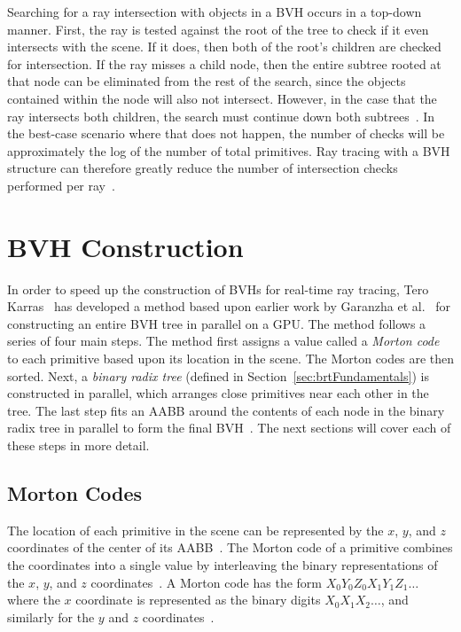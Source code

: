 \documentclass{sig-alternate}
\begin{document}
Searching for a ray intersection with objects in a BVH occurs in a top-down manner. First, the ray is tested against the root of the tree to check if it even intersects with the scene. If it does, then both of the root's children are checked for intersection. If the ray misses a child node, then the entire subtree rooted at that node can be eliminated from the rest of the search, since the objects contained within the node will also not intersect. However, in the case that the ray intersects both children, the search must continue down both subtrees~\cite{Gribble:2012}. In the best-case scenario where that does not happen, the number of checks will be approximately the log of the number of total primitives. Ray tracing with a BVH structure can therefore greatly reduce the number of intersection checks performed per ray~\cite{wiki:bvh}. 

\section{BVH Construction}
\label{sec:bvh}

In order to speed up the construction of BVHs for real-time ray tracing, Tero Karras~\cite{Karras:2012} has developed a method based upon earlier work by Garanzha et al.~\cite{Garanzha:2011} for constructing an entire BVH tree in parallel on a GPU. The method follows a series of four main steps. The method first assigns a value called a \emph{Morton code} to each primitive based upon its location in the scene. The Morton codes are then sorted. Next, a \emph{binary radix tree} (defined in Section~\ref{sec:brtFundamentals}) is constructed in parallel, which arranges close primitives near each other in the tree. The last step fits an AABB around the contents of each node in the binary radix tree in parallel to form the final BVH~\cite{Karras:2012}. The next sections will cover each of these steps in more detail.

\subsection{Morton Codes}
\label{sec:mortonCodes}

The location of each primitive in the scene can be represented by the $x$, $y$, and $z$ coordinates of the center of its AABB~\cite{Viitanen:2015, Wald:2007}. The Morton code of a primitive combines the coordinates into a single value by interleaving the binary representations of the $x$, $y$, and $z$ coordinates~\cite{Garanzha:2011}. A Morton code has the form \begin{math}X_{0}Y_{0}Z_{0}X_{1}Y_{1}Z_{1}\dots\end{math} where the $x$ coordinate is represented as the binary digits \begin{math}X_{0}X_{1}X_{2}\dots\end{math}, and similarly for the $y$ and $z$ coordinates~\cite{Karras:2012}.
\end{document}
